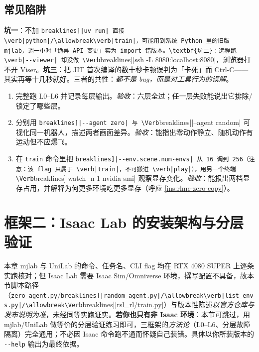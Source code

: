 \subsection{常见陷阱}

\begin{pitfall}
\textbf{坑一}：不加 \Verb[breaklines]|uv run| 直接 \verb|python|/\allowbreak\verb|train|，可能用到系统 Python 里的旧版 mjlab，调一小时「诡异 API 变更」实为 import 错版本。\textbf{坑二}：远程跑 \verb|--viewer| 却没做 \Verb[breaklines]|ssh -L 8080:localhost:8080|，浏览器打不开 Viser。\textbf{坑三}：把 JIT 首次编译的数十秒卡顿误判为「卡死」而 Ctrl-C——其实再等十几秒就好。三者的共性：\emph{都不是 bug，而是对工具行为的误解}。
\end{pitfall}

\begin{practice}
\begin{enumerate}
  \item 完整跑 L0--L6 并记录每层输出。\emph{验收}：六层全过；任一层失败能说出它排除/锁定了哪些层。
  \item 分别用 \Verb[breaklines]|--agent zero| 与 \Verb[breaklines]|--agent random| 可视化同一机器人，描述两者画面差异。\emph{验收}：能指出零动作静立、随机动作有运动但不应爆飞。
  \item 在 \verb|train| 命令里把 \Verb[breaklines]|--env.scene.num-envs| 从 16 调到 256（注意：该 flag 只属于 \verb|train|，不可搬进 \verb|play|），用另一个终端 \Verb[breaklines]|watch -n 1 nvidia-smi| 观察显存变化。\emph{验收}：能报出两档显存占用，并解释为何更多环境吃更多显存（呼应 \cref{ins:rlmc-zero-copy}）。
\end{enumerate}
\end{practice}

\section{框架二：Isaac Lab 的安装架构与分层验证}
\label{sec:rlmc-setup-isaaclab}

\begin{note}
本章 mjlab 与 UniLab 的命令、任务名、CLI flag 均在 RTX 4080 SUPER 上逐条实跑核对；但 Isaac Lab 需要 Isaac Sim/Omniverse 环境，撰写配置不具备，故本节脚本路径（\verb|zero_agent.py|/\allowbreak\Verb[breaklines]|random_agent.py|/\allowbreak\verb|list_envs.py|/\allowbreak\Verb[breaklines]|rsl_rl/train.py|）与版本性陈述\emph{以官方仓库与发布说明为准}，未经同等实跑证实。\textbf{若你也只有非 Isaac 环境}：本节可跳过，用 mjlab/UniLab 做等价的分层验证练习即可，三框架的\emph{方法论}（L0--L6、分层故障隔离）完全通用；不必因 Isaac 命令跑不通而怀疑自己装错。具体以你所装版本的 \verb|--help| 输出为最终依据。
\end{note}

